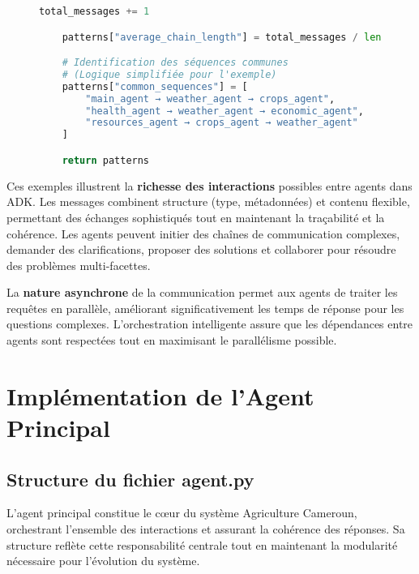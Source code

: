 \begin{figure}[h]
\begin{lstlisting}[language=Python, caption=Exemples de communications inter-agents en action]
            total_messages += 1

    patterns["average_chain_length"] = total_messages / len(scenarios)

    # Identification des séquences communes
    # (Logique simplifiée pour l'exemple)
    patterns["common_sequences"] = [
        "main_agent → weather_agent → crops_agent",
        "health_agent → weather_agent → economic_agent",
        "resources_agent → crops_agent → weather_agent"
    ]

    return patterns
\end{lstlisting}
\end{figure}

Ces exemples illustrent la \textbf{richesse des interactions} possibles entre agents dans ADK. Les messages combinent structure (type, métadonnées) et contenu flexible, permettant des échanges sophistiqués tout en maintenant la traçabilité et la cohérence. Les agents peuvent initier des chaînes de communication complexes, demander des clarifications, proposer des solutions et collaborer pour résoudre des problèmes multi-facettes.

La \textbf{nature asynchrone} de la communication permet aux agents de traiter les requêtes en parallèle, améliorant significativement les temps de réponse pour les questions complexes. L'orchestration intelligente assure que les dépendances entre agents sont respectées tout en maximisant le parallélisme possible.

\section{Implémentation de l'Agent Principal}

\subsection{Structure du fichier agent.py}

L'agent principal constitue le cœur du système Agriculture Cameroun, orchestrant l'ensemble des interactions et assurant la cohérence des réponses. Sa structure reflète cette responsabilité centrale tout en maintenant la modularité nécessaire pour l'évolution du système.

